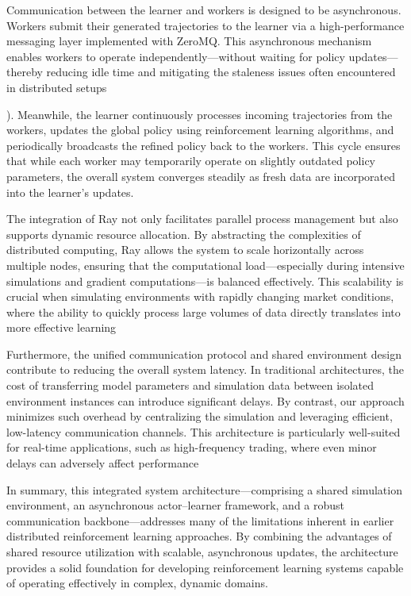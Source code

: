 Communication between the learner and workers is designed to be asynchronous.
Workers submit their generated trajectories to the learner via a high-performance messaging layer implemented with ZeroMQ.
This asynchronous mechanism enables workers to operate independently—without waiting for policy updates—
thereby reducing idle time and mitigating the staleness issues often encountered in distributed setups

). Meanwhile, the learner continuously processes incoming trajectories from the workers, updates the global policy using reinforcement learning algorithms,
and periodically broadcasts the refined policy back to the workers.
This cycle ensures that while each worker may temporarily operate on slightly outdated policy parameters,
the overall system converges steadily as fresh data are incorporated into the learner's updates.

The integration of Ray not only facilitates parallel process management but also supports dynamic resource allocation.
By abstracting the complexities of distributed computing, Ray allows the system to scale horizontally across multiple nodes,
ensuring that the computational load—especially during intensive simulations and gradient computations—is balanced effectively.
This scalability is crucial when simulating environments with rapidly changing market conditions,
where the ability to quickly process large volumes of data directly translates into more effective learning

Furthermore, the unified communication protocol and shared environment design contribute to reducing the overall system latency.
In traditional architectures, the cost of transferring model parameters and simulation data between isolated environment instances can
introduce significant delays. By contrast, our approach minimizes such overhead by centralizing the simulation and leveraging efficient,
low-latency communication channels.
This architecture is particularly well-suited for real-time applications, such as high-frequency trading,
where even minor delays can adversely affect performance

In summary, this integrated system architecture—comprising a shared simulation environment, an asynchronous actor–learner framework, and
a robust communication backbone—addresses many of the limitations inherent in earlier distributed reinforcement learning approaches.
By combining the advantages of shared resource utilization with scalable, asynchronous updates, the architecture provides a solid foundation for
developing reinforcement learning systems capable of operating effectively in complex, dynamic domains.


